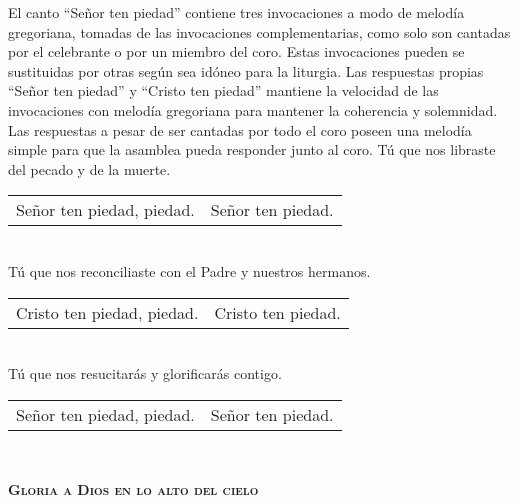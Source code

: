 \documentclass[12pt, letterpaper]{report}
\begin{document}
    \Large El canto ``Se\~nor ten piedad'' contiene tres invocaciones a modo de melod\'ia gregoriana,
    tomadas de las invocaciones complementarias, como solo son cantadas por el celebrante o por
    un miembro del coro. Estas invocaciones pueden se sustituidas por otras seg\'un sea id\'oneo para
    la liturgia. Las respuestas propias ``Se\~nor ten piedad'' y ``Cristo ten piedad'' mantiene la
    velocidad de las invocaciones con melod\'ia gregoriana para mantener la coherencia y solemnidad.
    Las respuestas a pesar de ser cantadas por todo el coro poseen una melod\'ia simple para que la
    asamblea pueda responder junto al coro.\newline
    \newline
    \noindent
    \LARGE {T\'u que nos libraste del pecado y de la muerte.}\\
    \LARGE \begin{tabular}{ll}
        Se\~nor ten piedad, piedad.& Se\~nor ten piedad.
    \end{tabular}\\
    \LARGE {T\'u que nos reconciliaste con el Padre y nuestros hermanos.}\\
    \LARGE \begin{tabular}{ll}
        Cristo ten piedad, piedad.& Cristo ten piedad.
    \end{tabular}\\
    \LARGE {T\'u que nos resucitar\'as y glorificar\'as contigo.}\\
    \LARGE \begin{tabular}{ll}
        Se\~nor ten piedad, piedad.& Se\~nor ten piedad.
    \end{tabular}\\
    \clearpage




    \begin{center}
        {\scshape \Huge {\bfseries Gloria a Dios en lo alto del cielo}}
    \end{center}
\end{document}
